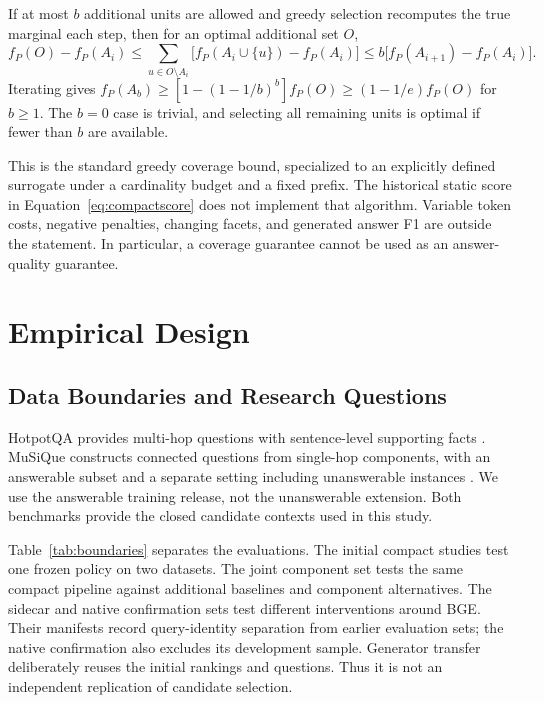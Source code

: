 \documentclass[11pt,a4paper]{article}
\begin{document}
If at most $b$ additional units are allowed and greedy selection recomputes
the true marginal each step, then for an optimal additional set $O$,
\begin{equation}
f_P(O)-f_P(A_i)\leq
\sum_{u\in O\setminus A_i}\big[f_P(A_i\cup\{u\})-f_P(A_i)\big]
\leq b\big[f_P(A_{i+1})-f_P(A_i)\big].
\end{equation}
Iterating gives
$f_P(A_b)\geq[1-(1-1/b)^b]f_P(O)\geq(1-1/e)f_P(O)$ for $b\geq1$.
The $b=0$ case is trivial, and selecting all remaining units is optimal if
fewer than $b$ are available.

This is the standard greedy coverage bound, specialized to an explicitly defined surrogate under a
cardinality budget and a fixed prefix. The historical static score in
Equation~\ref{eq:compactscore} does not implement that algorithm.
Variable token costs, negative penalties, changing facets, and generated
answer F1 are outside the statement. In particular, a coverage guarantee
cannot be used as an answer-quality guarantee.

\section{Empirical Design}
\subsection{Data Boundaries and Research Questions}
HotpotQA provides multi-hop questions with sentence-level supporting facts
\citep{yang2018hotpotqa}. MuSiQue constructs connected questions from
single-hop components, with an answerable subset and a separate setting
including unanswerable instances \citep{trivedi2022musique}. We use the
answerable training release, not the unanswerable extension. Both benchmarks
provide the closed candidate contexts used in this study.

Table~\ref{tab:boundaries} separates the evaluations. The initial compact
studies test one frozen policy on two datasets. The joint component set tests
the same compact pipeline against additional baselines and component
alternatives. The sidecar and native confirmation sets test different
interventions around BGE. Their manifests record query-identity separation
from earlier evaluation sets; the native confirmation also excludes its
development sample. Generator transfer deliberately reuses the initial
rankings and questions. Thus it is not an independent replication of
candidate selection.
\end{document}
